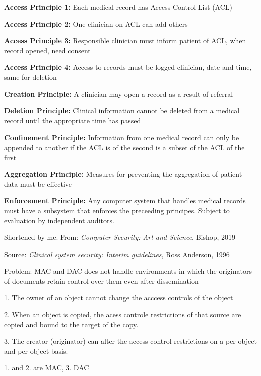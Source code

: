 \documentclass[Screen16to9,17pt]{foils}
\begin{document}

\begin{list2}
\item {\bf Access Principle 1:} Each medical record has Access Control List (ACL)
\item {\bf Access Principle 2:} One clinician on ACL can add others
\item {\bf Access Principle 3:} Responsible clinician must inform patient of ACL, when record opened, need consent
\item {\bf Access Principle 4:} Access to records must be logged clinician, date and time, same for deletion
\item {\bf Creation Principle:} A clinician may open a record as a result of referral
\item {\bf Deletion Principle:} Clinical information cannot be deleted from a medical record until the appropriate time has passed
\item {\bf Confinement Principle:} Information from one medical record can only be appended to another if the ACL is of the second is a subset of the ACL of the first
\item {\bf Aggregation Principle:} Measures for preventing the aggregation of patient data must be effective
\item {\bf Enforcement Principle:} Any computer system that handles medical records must have a subsystem that enforces the preceeding principes. Subject to evaluation by independent auditors.
\end{list2}

Shortened by me. From:
\emph{Computer Security: Art and Science}, Bishop, 2019


Source:
\emph{Clinical system security: Interim guidelines}, Ross Anderson, 1996



\begin{list1}
\item Problem: MAC and DAC does not handle environments in which the originators of documents retain control over them even after dissemination
\begin{list2}
\item 1. The owner of an object cannot change the acccess controls of the object
\item 2. When an object is copied, the acess controle restrictions of that source are copied and bound to the target of the copy.
\item 3. The creator (originator) can alter the access control restrictions on a per-object and per-object basis.
\end{list2}
\item 1. and 2. are MAC, 3. DAC
\end{list1}
\end{document}
